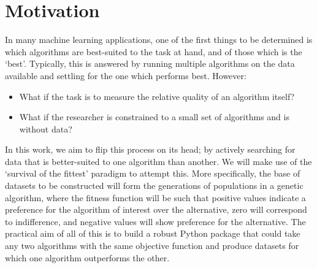 \section{Motivation}\label{sec:motivation}

In many machine learning applications, one of the first things to be determined
is which algorithms are best-suited to the task at hand, and of those which is
the `best'. Typically, this is answered by running  multiple algorithms on the
data available and settling for the one which performs best. However:

\begin{itemize}
    \item[] What if the task is to measure the relative quality of an algorithm
        itself?

    \item[] What if the researcher is constrained to a small set of algorithms
        and is without data?
\end{itemize}

In this work, we aim to flip this process on its head; by actively searching for
data that is better-suited to one algorithm than another. We will make use of
the `survival of the fittest' paradigm to attempt this. More specifically, the
base of datasets to be constructed will form the generations of populations in a
genetic algorithm, where the fitness function will be such that positive values
indicate a preference for the algorithm of interest over the alternative, zero
will correspond to indifference, and negative values will show preference for
the alternative. The practical aim of all of this is to build a robust Python
package that could take any two algorithms with the same objective function and
produce datasets for which one algorithm outperforms the other.
